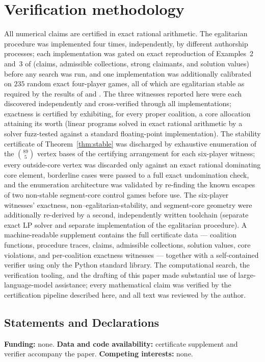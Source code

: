 \documentclass[11pt]{article}
\begin{document}


\section{Verification methodology}\label{sec:methods}

All numerical claims are certified in exact rational arithmetic. The
egalitarian procedure was implemented four times, independently, by
different authorship processes; each implementation was gated on exact
reproduction of Examples~2 and~3 of \citet{Dietzenbacher2021} (claims,
admissible collections, strong claimants, and solution values) before any
search was run, and one implementation was additionally calibrated on $235$
random exact four-player games, all of which are egalitarian stable as
required by the results of \citet{Biswas1999} and \citet{Dietzenbacher2021}.
The three witnesses reported here were each discovered independently and
cross-verified through all implementations; exactness is certified by
exhibiting, for every proper coalition, a core allocation attaining its
worth (linear programs solved in exact rational arithmetic by a solver
fuzz-tested against a standard floating-point implementation). The stability certificate of Theorem~\ref{thm:stable} was discharged by
exhaustive enumeration of the $\binom{89}{5}$ vertex bases of the certifying
arrangement for each six-player witness; every outside-core vertex was
discarded only against an exact rational dominating core element, borderline
cases were passed to a full exact undomination check, and the enumeration
architecture was validated by re-finding the known escapes of two non-stable
segment-core control games before use. The six-player witnesses' exactness,
non--egalitarian-stability, and segment-core geometry were additionally
re-derived by a second, independently written toolchain (separate exact LP
solver and separate implementation of the egalitarian procedure). A
machine-readable supplement contains the full certificate data ---
coalition functions, procedure traces, claims, admissible collections,
solution values, core violations, and per-coalition exactness
witnesses --- together with a self-contained verifier using only the Python
standard library. The computational search, the verification tooling, and
the drafting of this paper made substantial use of large-language-model
assistance; every mathematical claim was verified by the certification
pipeline described here, and all text was reviewed by the author.

\subsection*{Statements and Declarations}
\small
\textbf{Funding:} none.
\textbf{Data and code availability:} certificate supplement and verifier
accompany the paper.
\textbf{Competing interests:} none.
\normalsize
\end{document}
